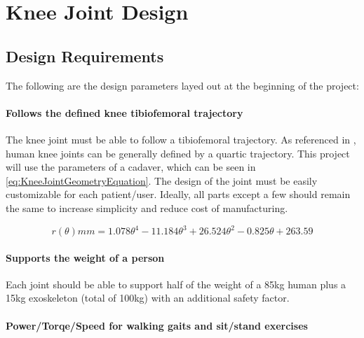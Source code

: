 \chapter{Knee Joint Design}



\section{Design Requirements}
\label{sec:DesignParams}
The following are the design parameters layed out at the beginning of the project:

\subsubsection{Follows the defined knee tibiofemoral trajectory}
The knee joint must be able to follow a tibiofemoral trajectory. As referenced in \cite{KinDynKneeJoint}, human knee joints can be generally defined by a quartic trajectory. This project will use the parameters of a cadaver, which can be seen in \autoref{eq:KneeJointGeometryEquation}. The design of the joint must be easily customizable for each patient/user. Ideally, all parts except a few should remain the same to increase simplicity and reduce cost of manufacturing.

\begin{equation}
    r(\theta) mm = 1.078\theta^4 - 11.184\theta^3 + 26.524\theta^2 - 0.825\theta + 263.59
    \label{eq:KneeJointGeometryEquation}
\end{equation}

\subsubsection{Supports the weight of a person}
Each joint should be able to support half of the weight of a 85kg human plus a 15kg exoskeleton (total of 100kg) with an additional safety factor. 

\subsubsection{Power/Torqe/Speed for walking gaits and sit/stand exercises}

